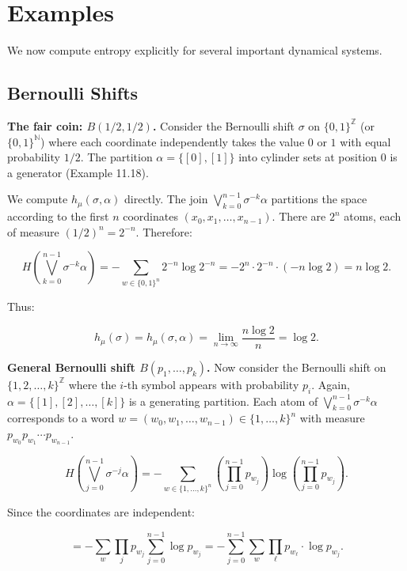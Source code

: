 \section{Examples}\label{sec:11.6}

We now compute entropy explicitly for several important dynamical systems.

\subsection{Bernoulli Shifts}\label{sec:11.6.1}

\textbf{The fair coin: $B(1/2, 1/2)$.} Consider the Bernoulli shift $\sigma$ on $\{0, 1\}^{\mathbb{Z}}$ (or $\{0,1\}^{\mathbb{N}}$) where each coordinate independently takes the value $0$ or $1$ with equal probability $1/2$. The partition $\alpha = \{[0], [1]\}$ into cylinder sets at position $0$ is a generator (Example 11.18).

We compute $h_\mu(\sigma, \alpha)$ directly. The join $\bigvee_{k=0}^{n-1} \sigma^{-k}\alpha$ partitions the space according to the first $n$ coordinates $(x_0, x_1, \ldots, x_{n-1})$. There are $2^n$ atoms, each of measure $(1/2)^n = 2^{-n}$. Therefore:

\[
H\!\left(\bigvee_{k=0}^{n-1} \sigma^{-k}\alpha\right) = -\sum_{w \in \{0,1\}^n} 2^{-n} \log 2^{-n} = -2^n \cdot 2^{-n} \cdot (-n \log 2) = n \log 2.
\]

Thus:

\[
h_\mu(\sigma) = h_\mu(\sigma, \alpha) = \lim_{n \to \infty} \frac{n \log 2}{n} = \log 2.
\]

\textbf{General Bernoulli shift $B(p_1, \ldots, p_k)$.} Now consider the Bernoulli shift on $\{1, 2, \ldots, k\}^{\mathbb{Z}}$ where the $i$-th symbol appears with probability $p_i$. Again, $\alpha = \{[1], [2], \ldots, [k]\}$ is a generating partition. Each atom of $\bigvee_{k=0}^{n-1}\sigma^{-k}\alpha$ corresponds to a word $w = (w_0, w_1, \ldots, w_{n-1}) \in \{1, \ldots, k\}^n$ with measure $p_{w_0} p_{w_1} \cdots p_{w_{n-1}}$.

\[
H\!\left(\bigvee_{j=0}^{n-1}\sigma^{-j}\alpha\right) = -\sum_{w \in \{1,\ldots,k\}^n} \left(\prod_{j=0}^{n-1} p_{w_j}\right) \log\!\left(\prod_{j=0}^{n-1} p_{w_j}\right).
\]

Since the coordinates are independent:

\[
= -\sum_{w} \prod_{j} p_{w_j} \sum_{j=0}^{n-1} \log p_{w_j} = -\sum_{j=0}^{n-1} \sum_{w} \prod_{\ell} p_{w_\ell} \cdot \log p_{w_j}.
\]

